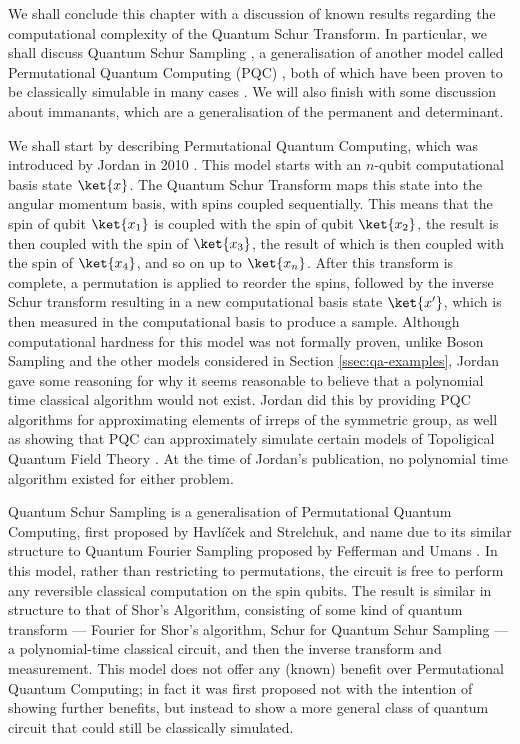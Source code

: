We shall conclude this chapter with a discussion of known results regarding the computational complexity of the Quantum Schur Transform. In particular, we shall discuss Quantum Schur Sampling \cite{havlicek2018}, a generalisation of another model called Permutational Quantum Computing (PQC) \cite{jordan2010}, both of which have been proven to be classically simulable in many cases \cite{havlicek2019}. We will also finish with some discussion about immanants, which are a generalisation of the permanent and determinant.

We shall start by describing Permutational Quantum Computing, which was introduced by Jordan in 2010 \cite{jordan2010}. This model starts with an $n$-qubit computational basis state $\ket{x}$. The Quantum Schur Transform maps this state into the angular momentum basis, with spins coupled sequentially. This means that the spin of qubit $\ket{x_1}$ is coupled with the spin of qubit $\ket{x_2}$, the result is then coupled with the spin of $\ket{x_3}$, the result of which is then coupled with the spin of $\ket{x_4}$, and so on up to $\ket{x_n}$. After this transform is complete, a permutation is applied to reorder the spins, followed by the inverse Schur transform resulting in a new computational basis state $\ket{x'}$, which is then measured in the computational basis to produce a sample. Although computational hardness for this model was not formally proven, unlike Boson Sampling and the other models considered in Section \ref{ssec:qa-examples}, Jordan gave some reasoning for why it seems reasonable to believe that a polynomial time classical algorithm would not exist. Jordan did this by providing PQC algorithms for approximating elements of irreps of the symmetric group, as well as showing that PQC can approximately simulate certain models of Topoligical Quantum Field Theory \cite{jordan2010}. At the time of Jordan's publication, no polynomial time algorithm existed for either problem.

Quantum Schur Sampling is a generalisation of Permutational Quantum Computing, first proposed by Havl\'{i}\v{c}ek and Strelchuk, and name due to its similar structure to Quantum Fourier Sampling proposed by Fefferman and Umans \cite{fefferman2016}. In this model, rather than restricting to permutations, the circuit is free to perform any reversible classical computation on the spin qubits. The result is similar in structure to that of Shor's Algorithm, consisting of some kind of quantum transform --- Fourier for Shor's algorithm, Schur for Quantum Schur Sampling --- a polynomial-time classical circuit, and then the inverse transform and measurement. This model does not offer any (known) benefit over Permutational Quantum Computing; in fact it was first proposed not with the intention of showing further benefits, but instead to show a more general class of quantum circuit that could still be classically simulated.

